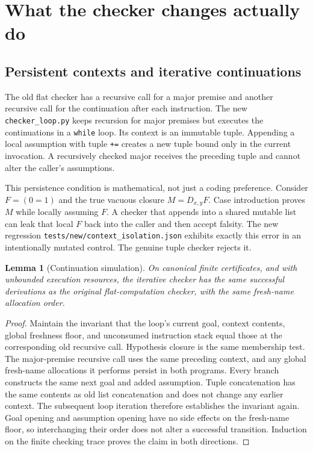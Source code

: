 \documentclass[11pt,letterpaper]{article}
\newtheorem{lemma}[theorem]{Lemma}
\theoremstyle{definition}\newtheorem{definition}[theorem]{Definition}
\theoremstyle{remark}\newtheorem{remark}[theorem]{Remark}
\newcommand{\file}[1]{{\small\nolinkurl{#1}}}
\begin{document}
\section{What the checker changes actually do}
\label{sec:checker-change}

\subsection{Persistent contexts and iterative continuations}

The old flat checker has a recursive call for a major premise and
another recursive call for the continuation after each instruction.
The new \file{checker_loop.py} keeps recursion for major premises
but executes the continuations in a \file{while} loop. Its context
is an immutable tuple. Appending a local assumption with tuple
\file{+=} creates a new tuple bound only in the current invocation.
A recursively checked major receives the preceding tuple and cannot
alter the caller's assumptions.

This persistence condition is mathematical, not just a coding
preference. Consider $F=(0=1)$ and the true vacuous closure
$M=D_{x,y}F$. Case introduction proves $M$ while locally assuming
$F$. A checker that appends into a shared mutable list can leak
that local $F$ back into the caller and then accept falsity.
The new regression \file{tests/new/context_isolation.json}
exhibits exactly this error in an intentionally mutated control.
The genuine tuple checker rejects it.

\begin{lemma}[Continuation simulation]
On canonical finite certificates, and with unbounded execution
resources, the iterative checker has the same successful derivations
as the original flat-computation checker, with the same fresh-name
allocation order.
\end{lemma}
\begin{proof}
Maintain the invariant that the loop's current goal, context contents,
global freshness floor, and unconsumed instruction stack equal those
at the corresponding old recursive call. Hypothesis closure is the
same membership test. The major-premise recursive call uses the
same preceding context, and any global fresh-name allocations it
performs persist in both programs. Every branch constructs the same
next goal and added assumption. Tuple concatenation has the same
contents as old list concatenation and does not change any earlier
context. The subsequent loop iteration therefore establishes the
invariant again. Goal opening and assumption opening have no
side effects on the fresh-name floor, so interchanging their order
does not alter a successful transition. Induction on the finite
checking trace proves the claim in both directions.
\end{proof}
\end{document}
